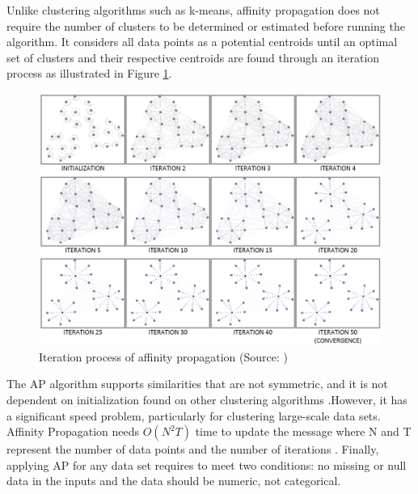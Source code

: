 \documentclass[../UNBThesis2.tex]{subfiles}
\begin{document}


Unlike clustering algorithms such as k-means, affinity propagation does not require the number of clusters to be determined or estimated before running the algorithm. It considers all data points as a potential centroids until an optimal set of clusters and their respective centroids are found through an iteration process as illustrated in Figure \ref{APPi}. 


\begin{figure}
\centering
\includegraphics[width = 13 cm]{image/Chapters/Chapter2/APDurek.PNG}
\caption{Iteration process of affinity propagation (Source: \protect\cite{dueck2009affinity})}
\label{APPi}
\end{figure}


The AP algorithm supports similarities that are not symmetric, and it is not dependent on initialization found on other clustering algorithms \cite{refianti2017time}.However, it has a significant speed problem, particularly for clustering large-scale data sets. Affinity Propagation needs $O(N^2T)$ time to update the message where N and T represent the number of data points and the number of iterations \cite{frey2007clustering}. Finally, applying AP for any data set requires to meet two conditions: no missing or null data in the inputs and the data should be numeric, not categorical.
\end{document}
